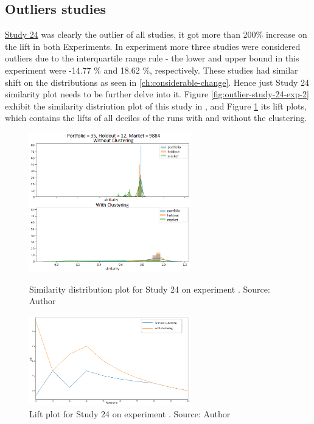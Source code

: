 \subsection{Outliers studies}

\underline{Study 24} was clearly the outlier of all studies, it got more than 200\% increase on the lift in both Experiments. In experiment \nameExperimentII{} more three studies were considered outliers due to the interquartile range rule - the lower and upper bound in this experiment were -14.77 \% and 18.62 \%, respectively. These studies had similar shift on the distributions as seen in \ref{ch:considerable-change}. Hence just Study 24 similarity plot needs to be further delve into it. Figure \ref{fig:outlier-study-24-exp-2} exhibit the similarity distriution plot of this study in \nameExperimentII{}, and Figure \ref{fig:outlier-study-24-lift-exp-2} its lift plots, which contains the lifts of all deciles of the runs with and without the clustering.

\begin{figure}[h]
   \centering
   \includegraphics[width=7cm]{fig/ch4-outlier-study-24-exp-2.png}
   \caption{Similarity distribution plot for Study 24 on experiment \nameExperimentII{}. Source: Author}
   \label{fig:outlier-study-24-exp-2}

   \includegraphics[width=7cm]{fig/ch4-outlier-study-24-lift-exp-2.png}
   \caption{Lift plot for Study 24 on experiment \nameExperimentII{}. Source: Author}
   \label{fig:outlier-study-24-lift-exp-2}
\end{figure}

